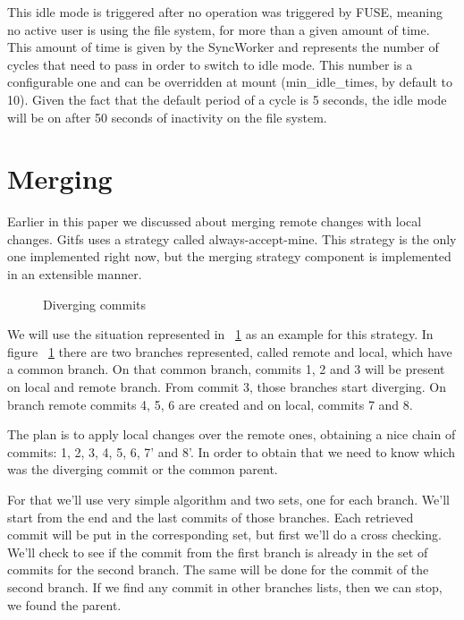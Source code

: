 This idle mode is triggered after no operation was triggered by FUSE, meaning no active user is using the file system, for more than a given amount of time. This amount of time is given by the SyncWorker and represents the number of cycles that need to pass in order to switch to idle mode. This number is a configurable one and can be overridden at mount (min\_idle\_times, by default to 10). Given the fact that the default period of a cycle is 5 seconds, the idle mode will be on after 50 seconds of inactivity on the file system.

\section{Merging}

Earlier in this paper we discussed about merging remote changes with local changes. Gitfs uses a strategy called always-accept-mine. This strategy is the only one implemented right now, but the merging strategy component is implemented in an extensible manner.

\begin{figure}[h]
  \begin{center}
    \def\svgwidth{\columnwidth}
    
  \end{center}
  \caption{Diverging commits}
  \label{fig:commits}
\end{figure}

We will use the situation represented in ~\ref{fig:commits} as an example for this strategy. In figure ~\ref{fig:commits} there are two branches represented, called remote and local, which have a common branch. On that common branch, commits 1, 2 and 3 will be present on local and remote branch. From commit 3, those branches start diverging. On branch remote commits 4, 5, 6 are created and on local, commits 7 and 8.

The plan is to apply local changes over the remote ones, obtaining a nice chain of commits: 1, 2, 3, 4, 5, 6, 7' and 8'. In order to obtain that we need to know which was the diverging commit or the common parent. 

For that we'll use very simple algorithm and two sets, one for each branch. We'll start from the end and the last commits of those branches. Each retrieved commit will be put in the corresponding set, but first we'll do a cross checking. We'll check to see if the commit from the first branch is already in the set of commits for the second branch. The same will be done for the commit of the second branch. If we find any commit in other branches lists, then we can stop, we found the parent.

